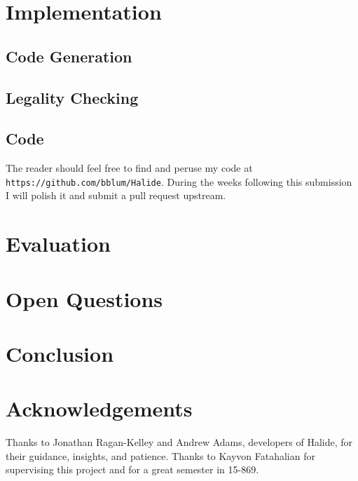 \documentclass{article}
\begin{document}
\section{Implementation}

\subsection{Code Generation}

\subsection{Legality Checking}

\subsection{Code}

The reader should feel free to find and peruse my code at \texttt{https://github.com/bblum/Halide}. During the weeks following this submission I will polish it and submit a pull request upstream.

\section{Evaluation}

\section{Open Questions}

\section{Conclusion}

\section*{Acknowledgements}

Thanks to Jonathan Ragan-Kelley and Andrew Adams, developers of Halide, for their guidance, insights, and patience. Thanks to Kayvon Fatahalian for supervising this project and for a great semester in 15-869.

{}

\end{document}
